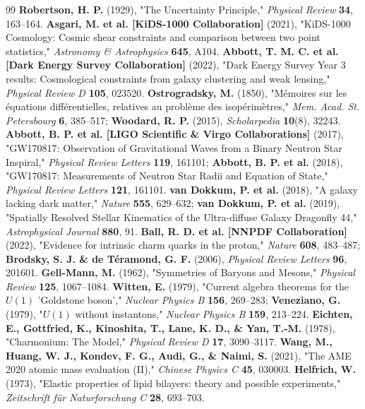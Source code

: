 \documentclass[10pt,a4paper]{article}
\begin{document}
\begin{thebibliography}{99}
 \textbf{Robertson, H. P.} (1929), "The Uncertainty Principle," \textit{Physical Review} \textbf{34}, 163–164.
 \textbf{Asgari, M. et al. [KiDS-1000 Collaboration]} (2021), "KiDS-1000 Cosmology: Cosmic shear constraints and comparison between two point statistics," \textit{Astronomy \& Astrophysics} \textbf{645}, A104.
 \textbf{Abbott, T. M. C. et al. [Dark Energy Survey Collaboration]} (2022), "Dark Energy Survey Year 3 results: Cosmological constraints from galaxy clustering and weak lensing," \textit{Physical Review D} \textbf{105}, 023520.
 \textbf{Ostrogradsky, M.} (1850), "Mémoires sur les équations différentielles, relatives au problème des isopérimètres," \textit{Mem. Acad. St. Petersbourg} \textbf{6}, 385–517; \textbf{Woodard, R. P.} (2015), \textit{Scholarpedia} \textbf{10}(8), 32243.
 \textbf{Abbott, B. P. et al. [LIGO Scientific \& Virgo Collaborations]} (2017), "GW170817: Observation of Gravitational Waves from a Binary Neutron Star Inspiral," \textit{Physical Review Letters} \textbf{119}, 161101; \textbf{Abbott, B. P. et al.} (2018), "GW170817: Measurements of Neutron Star Radii and Equation of State," \textit{Physical Review Letters} \textbf{121}, 161101.
 \textbf{van Dokkum, P. et al.} (2018), "A galaxy lacking dark matter," \textit{Nature} \textbf{555}, 629–632; \textbf{van Dokkum, P. et al.} (2019), "Spatially Resolved Stellar Kinematics of the Ultra-diffuse Galaxy Dragonfly 44," \textit{Astrophysical Journal} \textbf{880}, 91.
 \textbf{Ball, R. D. et al. [NNPDF Collaboration]} (2022), "Evidence for intrinsic charm quarks in the proton," \textit{Nature} \textbf{608}, 483–487; \textbf{Brodsky, S. J. \& de Téramond, G. F.} (2006), \textit{Physical Review Letters} \textbf{96}, 201601.
 \textbf{Gell-Mann, M.} (1962), "Symmetries of Baryons and Mesons," \textit{Physical Review} \textbf{125}, 1067–1084.
 \textbf{Witten, E.} (1979), "Current algebra theorems for the $U(1)$ 'Goldstone boson'," \textit{Nuclear Physics B} \textbf{156}, 269–283; \textbf{Veneziano, G.} (1979), "$U(1)$ without instantons," \textit{Nuclear Physics B} \textbf{159}, 213–224.
 \textbf{Eichten, E., Gottfried, K., Kinoshita, T., Lane, K. D., \& Yan, T.-M.} (1978), "Charmonium: The Model," \textit{Physical Review D} \textbf{17}, 3090–3117.
 \textbf{Wang, M., Huang, W. J., Kondev, F. G., Audi, G., \& Naimi, S.} (2021), "The AME 2020 atomic mass evaluation (II)," \textit{Chinese Physics C} \textbf{45}, 030003.
 \textbf{Helfrich, W.} (1973), "Elastic properties of lipid bilayers: theory and possible experiments," \textit{Zeitschrift für Naturforschung C} \textbf{28}, 693–703.

\end{thebibliography}
\end{document}
